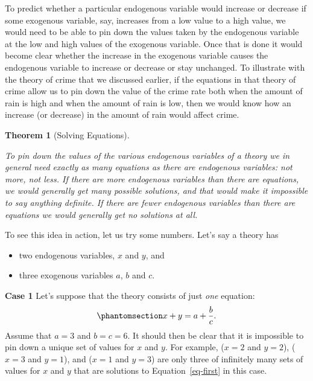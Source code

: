 \documentclass[
  letterpaper,
]{book}
\providecommand{\tightlist}{%
  \setlength{\itemsep}{0pt}\setlength{\parskip}{0pt}}\usepackage{longtable,booktabs,array}
\theoremstyle{plain}
\newtheorem{theorem}{Theorem}[chapter]
\theoremstyle{remark}
\begin{document}
To predict whether a particular endogenous variable would increase or
decrease if some exogenous variable, say, increases from a low value to
a high value, we would need to be able to pin down the values taken by
the endogenous variable at the low and high values of the exogenous
variable. Once that is done it would become clear whether the increase
in the exogenous variable causes the endogenous variable to increase or
decrease or stay unchanged. To illustrate with the theory of crime that
we discussed earlier, if the equations in that theory of crime allow us
to pin down the value of the crime rate both when the amount of rain is
high and when the amount of rain is low, then we would know how an
increase (or decrease) in the amount of rain would affect crime.

\begin{theorem}[Solving
Equations]\protect\hypertarget{thm-eqnno}{}\label{thm-eqnno}

To pin down the values of the various endogenous variables of a theory
we in general need exactly as many equations as there are endogenous
variables: not more, not less. If there are more endogenous variables
than there are equations, we would generally get many possible
solutions, and that would make it impossible to say anything definite.
If there are fewer endogenous variables than there are equations we
would generally get no solutions at all.

\end{theorem}

To see this idea in action, let us try some numbers. Let's say a theory
has

\begin{itemize}
\tightlist
\item
  two endogenous variables, \(x\) and \(y\), and
\item
  three exogenous variables \(a\), \(b\) and \(c\).
\end{itemize}

\textbf{Case 1} Let's suppose that the theory consists of just
\emph{one} equation: \begin{equation}\phantomsection\label{eq-first}{
x + y = a + \frac{b}{c}.
}\end{equation} Assume that \(a = 3\) and \(b = c = 6\). It should then
be clear that it is impossible to pin down a unique set of values for
\(x\) and \(y\). For example, (\(x = 2\) and \(y = 2\)), (\(x = 3\) and
\(y = 1\)), and (\(x = 1\) and \(y = 3\)) are only three of infinitely
many sets of values for \(x\) and \(y\) that are solutions to
Equation~\ref{eq-first} in this case.
\end{document}

